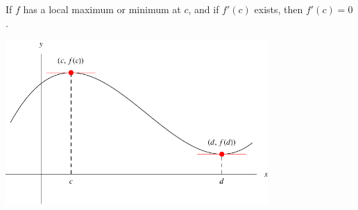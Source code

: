 \begin{frame}[t]
\begin{theorem}
If $f$ has a local maximum or minimum at $c$, and if $f'(c)$ exists, then $f'(c) = 0$.
\end{theorem}
\begin{center}
\includegraphics[width=10cm]{maxima-minima/pictures/04-01-ferm.pdf}%
\end{center}
\end{frame}
